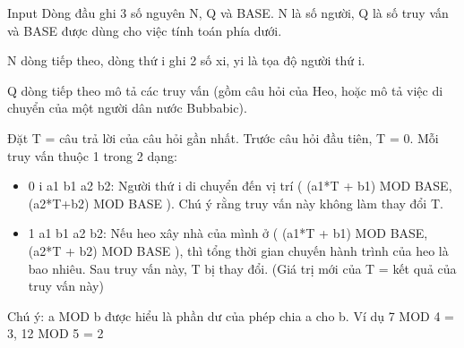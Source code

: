 Input  
Dòng đầu ghi 3 số nguyên N, Q và BASE. N là số người, Q là số truy vấn và BASE được dùng cho việc tính toán phía dưới.  

   N dòng tiếp theo, dòng thứ i ghi 2 số xi, yi là tọa độ người thứ i.  

   Q dòng tiếp theo mô tả các truy vấn (gồm câu hỏi của Heo, hoặc mô tả việc di chuyển của một người dân nước Bubbabic).  

   Đặt T = câu trả lời của câu hỏi gần nhất. Trước câu hỏi đầu tiên, T = 0. Mỗi truy vấn thuộc 1 trong 2 dạng:  
\begin{itemize}
	\item     0 i a1 b1 a2 b2: Người thứ i di chuyển đến vị trí ( (a1*T + b1) MOD BASE, (a2*T+b2) MOD BASE ). Chú ý rằng truy vấn này không làm thay đổi T.   
	\item     1 a1 b1 a2 b2: Nếu heo xây nhà của mình ở ( (a1*T + b1) MOD BASE, (a2*T + b2) MOD BASE ), thì tổng thời gian chuyến hành trình của heo là bao nhiêu. Sau truy vấn này, T bị thay đổi. (Giá trị mới của T = kết quả của truy vấn này)   
\end{itemize}

   Chú ý: a MOD b được hiểu là phần dư của phép chia a cho b. Ví dụ 7 MOD 4 = 3, 12 MOD 5 = 2